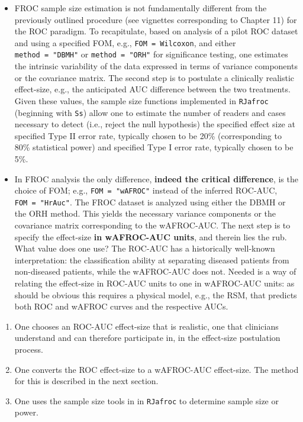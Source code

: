 \documentclass[]{book}
\providecommand{\tightlist}{%
  \setlength{\itemsep}{0pt}\setlength{\parskip}{0pt}}
\begin{document}
\begin{itemize}
\item
  FROC sample size estimation is not fundamentally different from the previously outlined procedure (see vignettes corresponding to Chapter 11) for the ROC paradigm. To recapitulate, based on analysis of a pilot ROC dataset and using a specified FOM, e.g., \texttt{FOM\ =\ Wilcoxon}, and either \texttt{method\ =\ "DBMH"} or \texttt{method\ =\ "ORH"} for significance testing, one estimates the intrinsic variability of the data expressed in terms of variance components or the covariance matrix. The second step is to postulate a clinically realistic effect-size, e.g., the anticipated AUC difference between the two treatments. Given these values, the sample size functions implemented in \texttt{RJafroc} (beginning with \texttt{Ss}) allow one to estimate the number of readers and cases necessary to detect (i.e., reject the null hypothesis) the specified effect size at specified Type II error rate, typically chosen to be 20\% (corresponding to 80\% statistical power) and specified Type I error rate, typically chosen to be 5\%.
\item
  In FROC analysis the only difference, \textbf{indeed the critical difference}, is the choice of FOM; e.g., \texttt{FOM\ =\ "wAFROC"} instead of the inferred ROC-AUC, \texttt{FOM\ =\ "HrAuc"}. The FROC dataset is analyzed using either the DBMH or the ORH method. This yields the necessary variance components or the covariance matrix corresponding to the wAFROC-AUC. The next step is to specify the effect-size \textbf{in wAFROC-AUC units}, and therein lies the rub. What value does one use? The ROC-AUC has a historically well-known interpretation: the classification ability at separating diseased patients from non-diseased patients, while the wAFROC-AUC does not. Needed is a way of relating the effect-size in ROC-AUC units to one in wAFROC-AUC units: as should be obvious this requires a physical model, e.g., the RSM, that predicts both ROC and wAFROC curves and the respective AUCs.
\end{itemize}

\begin{enumerate}
\def\labelenumi{\arabic{enumi}.}
\tightlist
\item
  One chooses an ROC-AUC effect-size that is realistic, one that clinicians understand and can therefore participate in, in the effect-size postulation process.
\item
  One converts the ROC effect-size to a wAFROC-AUC effect-size. The method for this is described in the next section.
\item
  One uses the sample size tools in in \texttt{RJafroc} to determine sample size or power.
\end{enumerate}
\end{document}
